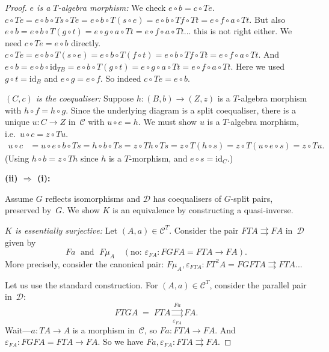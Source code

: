 \documentclass[a4paper,12pt]{book}
\newcommand{\id}{\mathrm{id}}
\theoremstyle{definition}
\theoremstyle{plain}
\theoremstyle{remark}
\begin{document}
\begin{proof}
\emph{$e$ is a $T$-algebra morphism:}
We check $e\circ b = c\circ Te$.
$c\circ Te = e\circ b\circ Ts\circ Te = e\circ b\circ T(s\circ e)
= e\circ b\circ Tf\circ Tt = e\circ f\circ a\circ Tt$.
But also $e\circ b = e\circ b\circ T(g\circ t) = e\circ g\circ a\circ Tt
= e\circ f\circ a\circ Tt$... this is not right either.
We need $c\circ Te = e\circ b$ directly.
$c\circ Te = e\circ b\circ T(s\circ e) = e\circ b\circ T(f\circ t)
= e\circ b\circ Tf\circ Tt = e\circ f\circ a\circ Tt$.
And $e\circ b = e\circ b\circ\id_{TB} = e\circ b\circ T(g\circ t)
= e\circ g\circ a\circ Tt = e\circ f\circ a\circ Tt$.
Here we used $g\circ t = \id_B$ and $e\circ g = e\circ f$.
So indeed $c\circ Te = e\circ b$.

\emph{$(C,c)$ is the coequaliser:}
Suppose $h\colon(B,b)\to(Z,z)$ is a $T$-algebra morphism with
$h\circ f = h\circ g$.  Since the underlying diagram is a split
coequaliser, there is a unique $u\colon C\to Z$ in~$\mathcal{C}$ with
$u\circ e = h$.  We must show $u$ is a $T$-algebra morphism, i.e.\
$u\circ c = z\circ Tu$.
\begin{align*}
    u\circ c &= u\circ e\circ b\circ Ts = h\circ b\circ Ts
    = z\circ Th\circ Ts = z\circ T(h\circ s)
    = z\circ T(u\circ e\circ s) = z\circ Tu.
\end{align*}
(Using $h\circ b = z\circ Th$ since $h$ is a $T$-morphism, and
$e\circ s = \id_C$.)

\medskip\noindent
\textbf{(ii) $\Rightarrow$ (i):}

Assume $G$ reflects isomorphisms and $\mathcal{D}$ has coequalisers
of $G$-split pairs, preserved by~$G$.  We show $K$ is an equivalence
by constructing a quasi-inverse.

\emph{$K$ is essentially surjective:}
Let $(A,a)\in\mathcal{C}^T$.  Consider the pair
$FTA \rightrightarrows FA$ in~$\mathcal{D}$ given by
\[
    Fa \;\text{ and }\; F\mu_A \quad (\text{no: }
    \varepsilon_{FA}\colon FGFA = FTA\to FA).
\]
More precisely, consider the canonical pair:
$F\mu_A, \varepsilon_{FTA}\colon FT^2A = FGFTA\rightrightarrows FTA$...

Let us use the standard construction.  For $(A,a)\in\mathcal{C}^T$,
consider the parallel pair in~$\mathcal{D}$:
\[
    FTGA \;=\; FTA \underset{\varepsilon_{FA}}{\overset{Fa}{\rightrightarrows}} FA.
\]
Wait---$a\colon TA\to A$ is a morphism in~$\mathcal{C}$, so $Fa\colon FTA\to FA$.
And $\varepsilon_{FA}\colon FGFA = FTA\to FA$.  So we have
$Fa,\varepsilon_{FA}\colon FTA\rightrightarrows FA$.


\end{proof}
\end{document}
